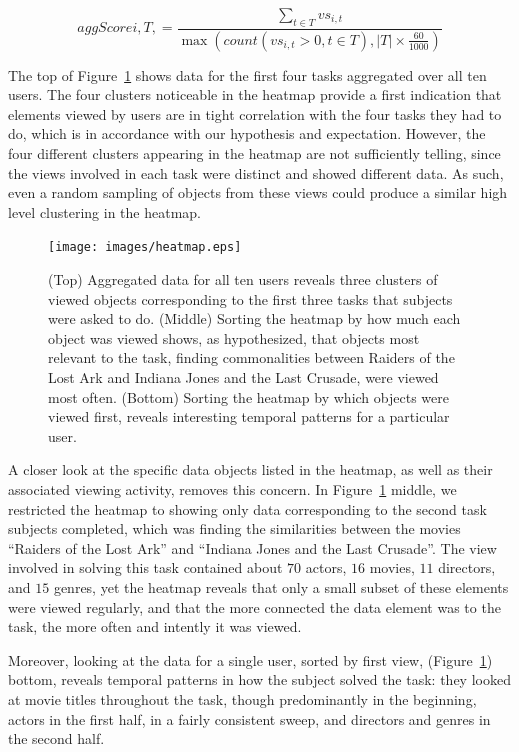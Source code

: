 \begin{equation}
aggScore{i,T,} = \frac{\displaystyle\sum_{t \in T }{vs_{i,t}}}{\max (count(vs_{i,t} > 0 , t \in T),|T| \times \frac{60}{1000}) }
\label{eq:Aggregate}
\end{equation}

The top of Figure~\ref{fig:heatmap} shows data for the first four tasks aggregated over all ten users. The four clusters noticeable in the heatmap provide a first indication that elements viewed by users are in tight correlation with the four tasks they had to do, which is in accordance with our hypothesis and expectation. However, the four different clusters appearing in the heatmap are not sufficiently telling, since the views involved in each task were distinct and showed different data. As such, even a random sampling of objects from these views could produce a similar high level clustering in the heatmap. 

\begin{figure}[htb]
  \centering
  \texttt{[image: images/heatmap.eps]}
  \caption{(Top) Aggregated data for all ten users reveals three clusters of viewed objects corresponding to the first three tasks that subjects were asked to do. (Middle) Sorting the heatmap by how much each object was viewed shows, as hypothesized, that objects most relevant to the task, finding commonalities between Raiders of the Lost Ark and Indiana Jones and the Last Crusade, were viewed most often. (Bottom) Sorting the heatmap by which objects were viewed first, reveals interesting temporal patterns for a particular user. }
	\label{fig:heatmap}
\end{figure}

A closer look at the specific data objects listed in the heatmap, as well as their associated viewing activity, removes this concern. In Figure~\ref{fig:heatmap} middle, we restricted the heatmap to showing only data corresponding to the second task subjects completed, which was finding the similarities between the movies ``Raiders of the Lost Ark'' and ``Indiana Jones and the Last Crusade''. The view involved in solving this task contained about $70$ actors, $16$ movies, $11$ directors, and $15$ genres, yet the heatmap reveals that only a small subset of these elements were viewed regularly, and that the more connected the data element was to the task, the more often and intently it was viewed.

Moreover, looking at the data for a single user, sorted by first view, (Figure~\ref{fig:heatmap}) bottom, reveals temporal patterns in how the subject solved the task: they looked at movie titles throughout the task, though predominantly in the beginning, actors in the first half, in a fairly consistent sweep, and directors and genres in the second half. 

